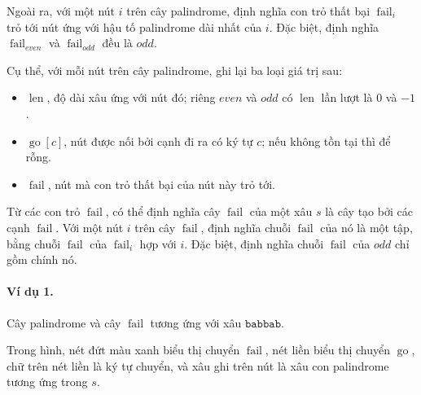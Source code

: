 \documentclass[11pt]{article}
\begin{document}
Ngoài ra, với một nút \(i\) trên cây palindrome, định nghĩa con trỏ thất bại
\(\operatorname{fail}_i\) trỏ tới nút ứng với hậu tố palindrome dài nhất của
\(i\). Đặc biệt, định nghĩa \(\operatorname{fail}_{\textit{even}}\) và
\(\operatorname{fail}_{\textit{odd}}\) đều là \(\textit{odd}\).

Cụ thể, với mỗi nút trên cây palindrome, ghi lại ba loại giá trị sau:

\begin{itemize}
  \item \(\operatorname{len}\), độ dài xâu ứng với nút đó; riêng
  \(\textit{even}\) và \(\textit{odd}\) có \(\operatorname{len}\) lần lượt là
  \(0\) và \(-1\).
  \item \(\operatorname{go}[c]\), nút được nối bởi cạnh đi ra có ký tự \(c\);
  nếu không tồn tại thì để rỗng.
  \item \(\operatorname{fail}\), nút mà con trỏ thất bại của nút này trỏ tới.
\end{itemize}

Từ các con trỏ \(\operatorname{fail}\), có thể định nghĩa cây
\(\operatorname{fail}\) của một xâu \(s\) là cây tạo bởi các cạnh
\(\operatorname{fail}\). Với một nút \(i\) trên cây \(\operatorname{fail}\),
định nghĩa chuỗi \(\operatorname{fail}\) của nó là một tập, bằng chuỗi
\(\operatorname{fail}\) của \(\operatorname{fail}_i\) hợp với \(i\). Đặc biệt,
định nghĩa chuỗi \(\operatorname{fail}\) của \(\textit{odd}\) chỉ gồm chính nó.

\paragraph{Ví dụ 1.}
Cây palindrome và cây \(\operatorname{fail}\) tương ứng với xâu
\(\texttt{babbab}\).

Trong hình, nét đứt màu xanh biểu thị chuyển \(\operatorname{fail}\), nét liền
biểu thị chuyển \(\operatorname{go}\), chữ trên nét liền là ký tự chuyển, và
xâu ghi trên nút là xâu con palindrome tương ứng trong \(s\).
\end{document}
